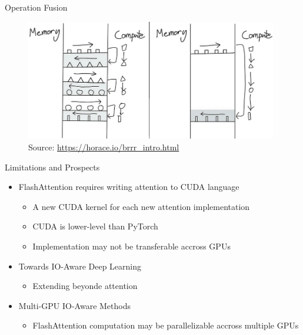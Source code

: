 
\begin{vbframe}{Operation Fusion}

\vfill

\begin{figure}
	\centering
	\includegraphics[width = 11cm]{./figure/op_fusion.png} \\ 
	{\footnotesize Source: \href{https://horace.io/brrr_intro.html}{\url{https://horace.io/brrr_intro.html}}}
\end{figure}

\vfill

\end{vbframe}


\begin{vbframe}{Limitations and Prospects}

\vfill

\begin{itemize}
	\item FlashAttention requires writing attention to CUDA language
	\begin{itemize}
		\item A new CUDA kernel for each new attention implementation
		\item CUDA is lower-level than PyTorch
		\item Implementation may not be transferable accross GPUs
	\end{itemize}
	\item Towards IO-Aware Deep Learning
	\begin{itemize}
		\item Extending beyonde attention
	\end{itemize}
	\item Multi-GPU IO-Aware Methods
	\begin{itemize}
		\item FlashAttention computation may be parallelizable accross multiple GPUs
	\end{itemize}
\end{itemize}

\vfill

\end{vbframe}

